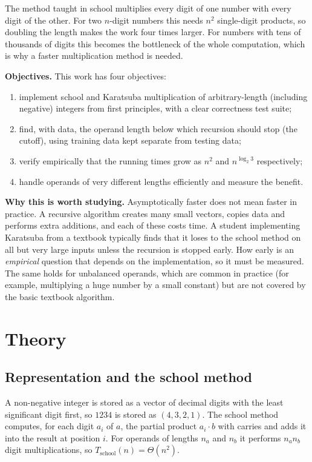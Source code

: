 \documentclass[11pt,a4paper]{article}
\begin{document}
The method taught in school multiplies every digit of one number with every digit of the other. For two $n$-digit numbers this needs $n^2$ single-digit products, so doubling the length makes the work four times larger. For numbers with tens of thousands of digits this becomes the bottleneck of the whole computation, which is why a faster multiplication method is needed.

\textbf{Objectives.} This work has four objectives:
\begin{enumerate}[nosep]
  \item implement school and Karatsuba multiplication of arbitrary-length (including negative) integers from first principles, with a clear correctness test suite;
  \item find, with data, the operand length below which recursion should stop (the cutoff), using training data kept separate from testing data;
  \item verify empirically that the running times grow as $n^{2}$ and $n^{\log_2 3}$ respectively;
  \item handle operands of very different lengths efficiently and measure the benefit.
\end{enumerate}

\textbf{Why this is worth studying.} Asymptotically faster does not mean faster in practice. A recursive algorithm creates many small vectors, copies data and performs extra additions, and each of these costs time. A student implementing Karatsuba from a textbook typically finds that it loses to the school method on all but very large inputs unless the recursion is stopped early. How early is an \emph{empirical} question that depends on the implementation, so it must be measured. The same holds for unbalanced operands, which are common in practice (for example, multiplying a huge number by a small constant) but are not covered by the basic textbook algorithm.

\section{Theory}
\label{sec:theory}

\subsection{Representation and the school method}
A non-negative integer is stored as a vector of decimal digits with the least significant digit first, so $1234$ is stored as $(4,3,2,1)$. The school method computes, for each digit $a_i$ of $a$, the partial product $a_i\cdot b$ with carries and adds it into the result at position $i$. For operands of lengths $n_a$ and $n_b$ it performs $n_a n_b$ digit multiplications, so $T_{\text{school}}(n)=\Theta(n^2)$.
\end{document}
